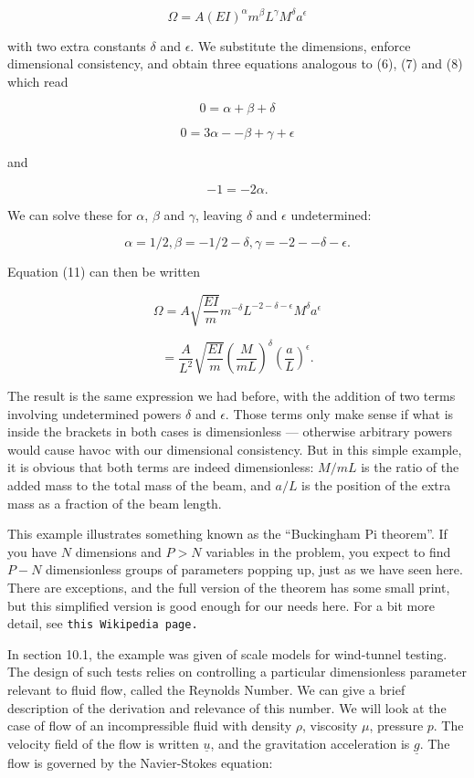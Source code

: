   $$\Omega=A (EI)^\alpha m^\beta L^\gamma M^\delta a^\epsilon \tag{11}$$ 

  with two extra constants $\delta$ and $\epsilon$. We substitute the 
  dimensions, enforce dimensional consistency, and obtain three equations 
  analogous to (6), (7) and (8) which read 

  $$0=\alpha + \beta + \delta \tag{12}$$ 

  $$0 = 3 \alpha -- \beta + \gamma + \epsilon \tag{13}$$ 

  and 

  $$-1=-2 \alpha. \tag{14}$$ 

  We can solve these for $\alpha$, $\beta$ and $\gamma$, leaving $\delta$ and 
  $\epsilon$ undetermined: 

  $$\alpha = 1/2, \beta = -1/2 -\delta, \gamma= -2 -- \delta -\epsilon . 
  \tag{15}$$ 

  Equation (11) can then be written 

  $$\Omega= A \sqrt{\dfrac{EI}{m}} m^{-\delta} L^{-2 -\delta -\epsilon} 
  M^\delta a^\epsilon $$ 

  $$= \dfrac{A}{L^2} \sqrt{\dfrac{EI}{m}} \left(\dfrac{M}{mL} \right)^\delta 
  \left(\dfrac{a}{L} \right)^\epsilon . \tag{16}$$ 

  The result is the same expression we had before, with the addition of two 
  terms involving undetermined powers $\delta$ and $\epsilon$. Those terms only 
  make sense if what is inside the brackets in both cases is dimensionless --- 
  otherwise arbitrary powers would cause havoc with our dimensional 
  consistency. But in this simple example, it is obvious that both terms are 
  indeed dimensionless: $M/mL$ is the ratio of the added mass to the total mass 
  of the beam, and $a/L$ is the position of the extra mass as a fraction of the 
  beam length. 

  This example illustrates something known as the ``Buckingham Pi theorem''. If 
  you have $N$ dimensions and $P > N$ variables in the problem, you expect to 
  find $P-N$ dimensionless groups of parameters popping up, just as we have 
  seen here. There are exceptions, and the full version of the theorem has some 
  small print, but this simplified version is good enough for our needs here. 
  For a bit more detail, see \tt{}this Wikipedia page\rm{}. 

  In section 10.1, the example was given of scale models for wind-tunnel 
  testing. The design of such tests relies on controlling a particular 
  dimensionless parameter relevant to fluid flow, called the Reynolds Number. 
  We can give a brief description of the derivation and relevance of this 
  number. We will look at the case of flow of an incompressible fluid with 
  density $\rho$, viscosity $\mu$, pressure $p$. The velocity field of the flow 
  is written $\underline{u}$, and the gravitation acceleration is 
  $\underline{g}$. The flow is governed by the Navier-Stokes equation: 

